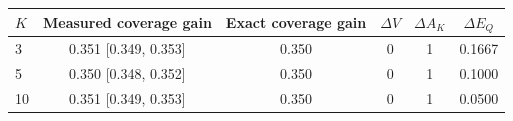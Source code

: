\begin{tabular}{lccccc}
\toprule
$K$ & Measured coverage gain & Exact coverage gain & $\Delta V$ & $\Delta A_K$ & $\Delta E_Q$ \\
\midrule
3 & 0.351 [0.349, 0.353] & 0.350 & 0 & 1 & 0.1667 \\
5 & 0.350 [0.348, 0.352] & 0.350 & 0 & 1 & 0.1000 \\
10 & 0.351 [0.349, 0.353] & 0.350 & 0 & 1 & 0.0500 \\
\bottomrule
\end{tabular}
